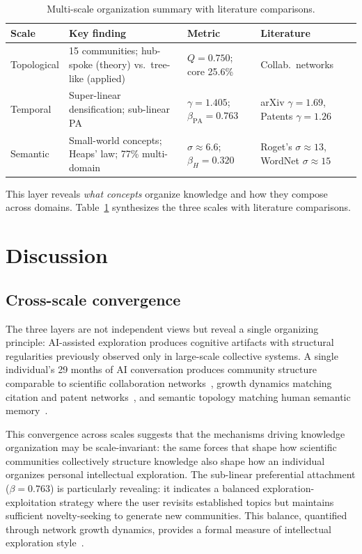\documentclass[journal]{IEEEtran}
\begin{document}
\begin{table}[t]
  \centering
  \caption{Multi-scale organization summary with literature comparisons.}
  \label{tab:summary}
  \small
  \begin{tabular}{@{}p{1.2cm}p{2.1cm}p{1.7cm}p{2.1cm}@{}}
    \toprule
    \textbf{Scale} & \textbf{Key finding} & \textbf{Metric} &
    \textbf{Literature} \\
    \midrule
    Topological &
      15 communities; hub-spoke (theory) vs.\ tree-like (applied) &
      $Q = 0.750$; core 25.6\% &
      Collab.\ networks \\
    Temporal &
      Super-linear densification; sub-linear PA &
      $\gamma = 1.405$; $\beta_\text{PA} = 0.763$ &
      arXiv $\gamma{=}1.69$, Patents $\gamma{=}1.26$ \\
    Semantic &
      Small-world concepts; Heaps' law; 77\% multi-domain &
      $\sigma \approx 6.6$; $\beta_H = 0.320$ &
      Roget's $\sigma{\approx}13$, WordNet $\sigma{\approx}15$ \\
    \bottomrule
  \end{tabular}
\end{table}

This layer reveals \emph{what concepts} organize knowledge and how they
compose across domains.  Table~\ref{tab:summary} synthesizes the three
scales with literature comparisons.

\section{Discussion}
\label{sec:discussion}

\subsection{Cross-scale convergence}

The three layers are not independent views but reveal a single organizing
principle: AI-assisted exploration produces cognitive artifacts with
structural regularities previously observed only in large-scale
collective systems.  A single individual's 29 months of AI conversation
produces community structure comparable to scientific collaboration
networks~\cite{newman2006modularity, fortunato2010community}, growth
dynamics matching citation and patent
networks~\cite{leskovec2007graph}, and semantic topology matching human
semantic memory~\cite{steyvers2005large}.

This convergence across scales suggests that the mechanisms driving
knowledge organization may be scale-invariant: the same forces that
shape how scientific communities collectively structure knowledge also
shape how an individual organizes personal intellectual exploration.
The sub-linear preferential attachment ($\beta = 0.763$) is
particularly revealing: it indicates a balanced
exploration-exploitation strategy where the user revisits established
topics but maintains sufficient novelty-seeking to generate new
communities.  This balance, quantified through network growth dynamics,
provides a formal measure of intellectual exploration
style~\cite{hills2015exploration, march1991exploration}.
\end{document}
